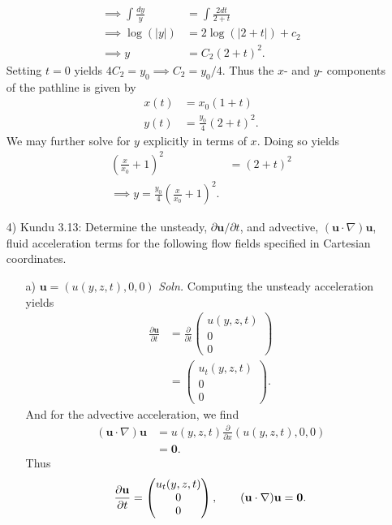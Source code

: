\documentclass{article}
\begin{document}
\begin{itemize}
\begin{align*}
        \implies \int\frac{dy}{y} &= \int\frac{2dt}{2+t}\\
        \implies \log(|y|) &= 2\log(|2+t|) + c_2\\
        \implies y &= C_2(2+t)^2.
    \end{align*}
    Setting $t = 0$ yields $4C_2 = y_0 \implies C_2 = y_0/4$. Thus the $x$- and $y$- components of the pathline is given by
    \begin{align*}
        x(t) &= x_0(1 + t)\\
        y(t) &= \frac{y_0}{4}(2 + t)^2.
    \end{align*}
    We may further solve for $y$ explicitly in terms of $x$. Doing so yields
    \begin{align*}
        \left(\frac{x}{x_0} + 1\right)^2 &= (2+t)^2\\
        \implies y = \frac{y_0}{4}\left(\frac{x}{x_0} + 1\right)^2.
    \end{align*}


    \pagebreak
    \item[4)] Kundu 3.13: Determine the unsteady, $\partial\mathbf{u}/\partial t$, and advective, $(\mathbf{u} \cdot\nabla)\mathbf{u}$, fluid acceleration terms for the following flow fields specified in Cartesian coordinates.
    \begin{itemize}
        \item[a)] $\mathbf{u} = (u(y,z,t),0,0)$
        \newline\newline
        \textit{Soln.} Computing the unsteady acceleration yields
        \begin{align*}
            \frac{\partial \mathbf{u}}{\partial t} &= \frac{\partial }{\partial t}\begin{pmatrix}
                u(y,z,t)\\
                0\\
                0
            \end{pmatrix}\\
            &= \begin{pmatrix}
                u_t(y,z,t)\\
                0\\
                0
            \end{pmatrix}.
        \end{align*}
        And for the advective acceleration, we find
        \begin{align*}
            (\mathbf{u}\cdot \nabla)\mathbf{u} &= u(y,z,t)\frac{\partial}{\partial x}(u(y,z,t),0,0)\\
            &= \mathbf{0}.
        \end{align*}
        Thus
        \[\frac{\partial \mathbf{u}}{\partial t} = \begin{pmatrix}
            u_t(y,z,t)\\
            0\\
            0
        \end{pmatrix},\hspace{0.7cm} (\mathbf{u}\cdot\nabla)\mathbf{u} = \mathbf{0}.\]
        


\end{itemize}
\end{itemize}
\end{document}
